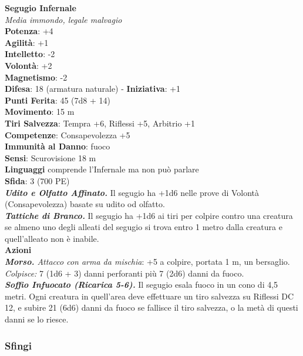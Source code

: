 \begin{multicols}{2}
\medskip\textbf{Segugio Infernale}\\
\emph{Media immondo, legale malvagio}\\
\textbf{Potenza}: +4\\
\textbf{Agilità}: +1\\
\textbf{Intelletto}: -2\\
\textbf{Volontà}: +2\\
\textbf{Magnetismo}: -2\\
\textbf{Difesa}: 18 (armatura naturale) - \textbf{Iniziativa}: +1\\
\textbf{Punti Ferita}: 45 (7d8 + 14)\\
\textbf{Movimento}: 15 m\\
\textbf{Tiri Salvezza}: Tempra +6, Riflessi +5, Arbitrio +1\\
\textbf{Competenze}: Consapevolezza +5\\
\textbf{Immunità al Danno}: fuoco\\
\textbf{Sensi}: Scurovisione 18 m\\
\textbf{Linguaggi} comprende l'Infernale ma non può parlare\\
\textbf{Sfida}: 3 (700 PE)\smallskip\\
\emph{\textbf{Udito e Olfatto Affinato.}} Il segugio ha +1d6 nelle prove di Volontà (Consapevolezza) basate su udito od olfatto.\\
\emph{\textbf{Tattiche di Branco.}} Il segugio ha +1d6 ai tiri per colpire contro una creatura se almeno uno degli alleati del segugio si trova entro 1 metro dalla creatura e quell'alleato non è inabile.\\
\smallskip\textbf{Azioni}\\
\emph{\textbf{Morso.} Attacco con arma da mischia}: +5 a colpire, portata 1 m, un bersaglio.\\
\emph{Colpisce:} 7 (1d6 + 3) danni perforanti più 7 (2d6) danni da fuoco.\\
\emph{\textbf{Soffio Infuocato (Ricarica 5-6).}} Il segugio esala fuoco in un cono di 4,5 metri. Ogni creatura in quell'area deve effettuare un tiro salvezza su Riflessi DC 12, e subire 21 (6d6) danni da fuoco se fallisce il tiro salvezza, o la metà di questi danni se lo riesce.\\

\subsubsection{Sfingi}


\end{multicols}
